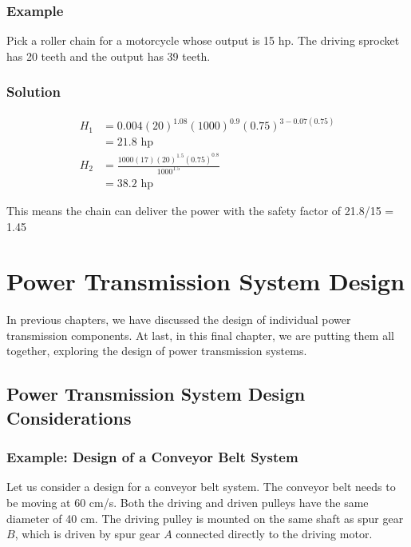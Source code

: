 \documentclass[a4paper,openany,svgnames]{kaobook}
\begin{document}
\subsection{Example}
\label{sec:org8866d8c}

Pick a roller chain for a motorcycle whose output is 15 hp. The driving sprocket has 20 teeth and the output has 39 teeth.

\subsection{Solution}
\label{sec:orgdf85a45}

\begin{align*}
    H_1 &= 0.004(20)^{1.08}(1000)^{0.9}(0.75)^{3-0.07(0.75)} \\
        &= 21.8 \text{ hp} \\
    H_2 &= \frac{1000(17)(20)^{1.5}(0.75)^{0.8}}{1000^{1.5}} \\
        &= 38.2 \text{ hp}
\end{align*}

This means the chain can deliver the power with the safety factor of 21.8/15 = 1.45

\chapter{Power Transmission System Design}
\label{sec:org8559f1a}

In previous chapters, we have discussed the design of individual power transmission components. At last, in this final chapter, we are putting them all together, exploring the design of power transmission systems.

\section{Power Transmission System Design Considerations}
\label{sec:orgfbae754}

\subsection{Example: Design of a Conveyor Belt System}
\label{sec:orga5ded03}

Let us consider a design for a conveyor belt system. The conveyor belt
needs to be moving at 60 cm/s. Both the driving and driven pulleys have
the same diameter of 40 cm. The driving pulley is mounted on the same
shaft as spur gear \(B\), which is driven by spur gear \(A\) connected
directly to the driving motor.
\end{document}

